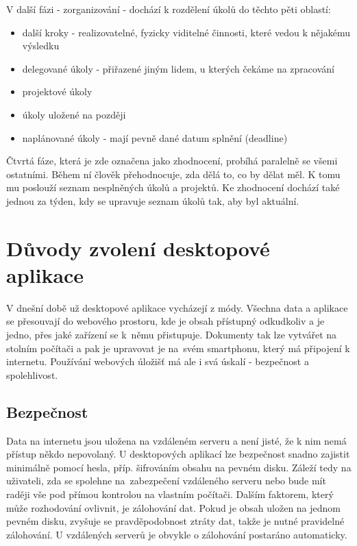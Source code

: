 V další fázi - zorganizování - dochází k rozdělení úkolů do těchto pěti oblastí:

\begin{itemize}
\item další kroky - realizovatelné, fyzicky viditelné činnosti, které vedou k nějakému výsledku
\item delegované úkoly - přiřazené jiným lidem, u kterých čekáme na zpracování
\item projektové úkoly
\item úkoly uložené na později
\item naplánované úkoly - mají pevně dané datum splnění (deadline)
\end{itemize}

Čtvrtá fáze, která je zde označena jako zhodnocení, probíhá paralelně se všemi ostatními. Během ní člověk přehodnocuje, zda dělá to, co by dělat měl. K tomu mu poslouží seznam nesplněných úkolů a projektů. Ke zhodnocení dochází také jednou za týden, kdy se upravuje seznam úkolů tak, aby byl aktuální.

\section{Důvody zvolení desktopové aplikace}

V dnešní době už desktopové aplikace vycházejí z módy. Všechna data a aplikace se přesouvají do webového prostoru, kde je obsah přístupný odkudkoliv a je jedno, přes jaké zařízení se k~němu přistupuje. Dokumenty tak lze vytvářet na stolním počítači a pak je upravovat je na~svém smartphonu, který má připojení k internetu. Používání webových úložišť má ale i svá úskalí - bezpečnost a spolehlivost.

\subsection{Bezpečnost}

Data na internetu jsou uložena na vzdáleném serveru a není jisté, že k nim nemá přístup někdo nepovolaný. U desktopových aplikací lze bezpečnost snadno zajistit minimálně pomocí hesla, příp. šifrováním obsahu na pevném disku. Záleží tedy na uživateli, zda se spolehne na~zabezpečení vzdáleného serveru nebo bude mít raději vše pod přímou kontrolou na vlastním počítači. Dalším faktorem, který může rozhodování ovlivnit, je zálohování dat. Pokud je obsah uložen na jednom pevném disku, zvyšuje se pravděpodobnost ztráty dat, takže je nutné pravidelné zálohování. U vzdálených serverů je obvykle o zálohování postaráno automaticky. 

